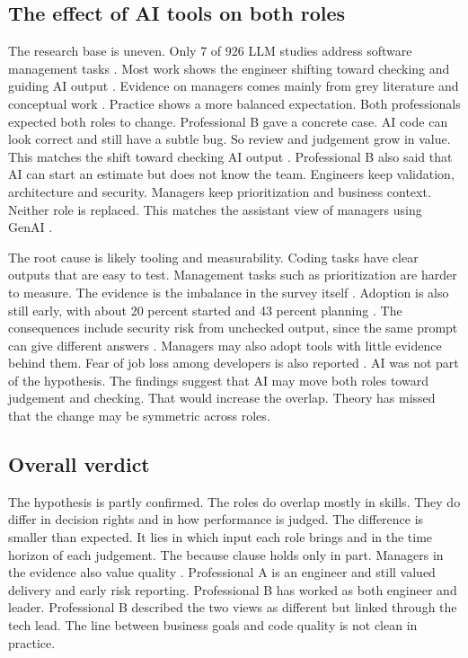 \documentclass[conference]{IEEEtran}
\begin{document}
\subsection{The effect of AI tools on both roles}

The research base is uneven. Only 7 of 926 LLM studies address software management tasks \cite{zhang2026}. Most work shows the engineer shifting toward checking and guiding AI output \cite{gao2024}. Evidence on managers comes mainly from grey literature and conceptual work \cite{assalaarachchi2025,bahi2024}. Practice shows a more balanced expectation. Both professionals expected both roles to change. Professional B gave a concrete case. AI code can look correct and still have a subtle bug. So review and judgement grow in value. This matches the shift toward checking AI output \cite{gao2024}. Professional B also said that AI can start an estimate but does not know the team. Engineers keep validation, architecture and security. Managers keep prioritization and business context. Neither role is replaced. This matches the assistant view of managers using GenAI \cite{assalaarachchi2025}.

The root cause is likely tooling and measurability. Coding tasks have clear outputs that are easy to test. Management tasks such as prioritization are harder to measure. The evidence is the imbalance in the survey itself \cite{zhang2026}. Adoption is also still early, with about 20 percent started and 43 percent planning \cite{pashchenko2025}. The consequences include security risk from unchecked output, since the same prompt can give different answers \cite{bahi2024}. Managers may also adopt tools with little evidence behind them. Fear of job loss among developers is also reported \cite{zhao2025}. AI was not part of the hypothesis. The findings suggest that AI may move both roles toward judgement and checking. That would increase the overlap. Theory has missed that the change may be symmetric across roles.

\subsection{Overall verdict}

The hypothesis is partly confirmed. The roles do overlap mostly in skills. They do differ in decision rights and in how performance is judged. The difference is smaller than expected. It lies in which input each role brings and in the time horizon of each judgement. The because clause holds only in part. Managers in the evidence also value quality \cite{suwarno2025}. Professional A is an engineer and still valued delivery and early risk reporting. Professional B has worked as both engineer and leader. Professional B described the two views as different but linked through the tech lead. The line between business goals and code quality is not clean in practice.
\end{document}
